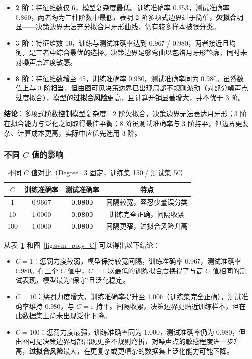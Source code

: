 \documentclass[10.5pt]{config}
\begin{document}
\begin{itemize}
    \item \textbf{2 阶}：特征维数仅 6，模型复杂度最低。训练准确率 0.853，测试准确率 0.860，两者均为三种阶数中最低，表明 2 阶多项式边界过于简单，\textbf{欠拟合}明显——决策边界无法充分拟合月牙形曲线，仍有较多样本被误分类。
    \item \textbf{3 阶}：特征维数 10，训练与测试准确率达到 0.967 / 0.980，两者接近且均衡，是三者中综合最优的选择。决策边界足够弯曲以包络月牙形轮廓，同时未对噪声点过度敏感。
    \item \textbf{8 阶}：特征维数增至 45，训练准确率 0.980，测试准确率同为 0.980。虽然数值上与 3 阶相当，但由图可见决策边界已出现局部不规则波动（对部分噪声点过度拟合），模型的\textbf{过拟合风险}更高，且计算开销显著增大，并不优于 3 阶。
\end{itemize}

\textbf{结论}：多项式阶数控制模型复杂度。2 阶欠拟合，决策边界无法表达月牙形；3 阶在拟合能力与泛化之间取得最佳平衡；8 阶虽测试准确率与 3 阶持平，但边界更复杂、计算成本更高，实际中应优先选用 3 阶。

\subsubsection{不同 $C$ 值的影响}

\begin{table}[H]
    \centering
    \caption{不同 $C$ 值对比（Degree=3 固定，训练集 150 / 测试集 50）}
    \begin{tabular}{cccc}
        \hline
        $C$ & 训练准确率 & 测试准确率 & 特点 \\
        \hline
        1   & 0.9667 & \textbf{0.9800} & 间隔较宽，容忍少量误分类 \\
        10  & 1.0000 & \textbf{0.9800} & 训练完全正确，间隔收紧 \\
        100 & 1.0000 & \textbf{0.9800} & 间隔更窄，过拟合风险升高 \\
        \hline
    \end{tabular}
    \label{tab:C_compare}
\end{table}

从表~\ref{tab:C_compare} 和图~\ref{fig:svm_poly_C} 可以得出以下结论：

\begin{itemize}
    \item \textbf{$C=1$}：惩罚力度较弱，模型保持较宽间隔，训练准确率 0.967，测试准确率 0.980。在三个 $C$ 值中，$C=1$ 以最低的训练拟合度换得了与高 $C$ 值相同的测试表现，模型最为"保守"且泛化稳定。
    \item \textbf{$C=10$}：惩罚力度增大，训练准确率提升至 1.000（训练集完全正确），测试准确率维持 0.980，与 $C=1$ 持平。间隔收紧，决策边界更贴近训练样本，但在此数据集上尚未出现泛化下降。
    \item \textbf{$C=100$}：惩罚力度最强，训练准确率同为 1.000，测试准确率仍为 0.980，但由图可见决策边界局部出现更多不规则弯折，对噪声点的敏感程度进一步升高，\textbf{过拟合风险}最大，在更复杂或更嘈杂的数据集上泛化能力可能下降。
\end{itemize}
\end{document}

